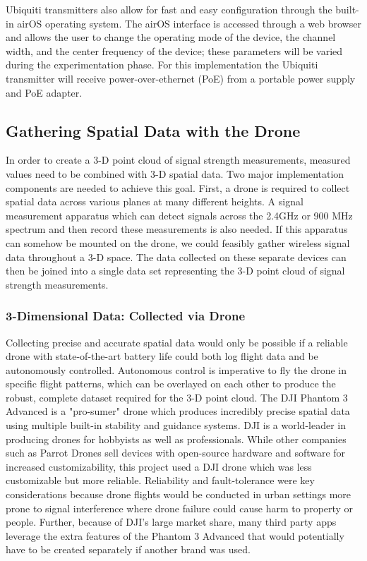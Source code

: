 \documentclass[pageno]{jpaper}
\begin{document}
Ubiquiti transmitters also allow for fast and easy configuration through the built-in airOS operating system. The airOS interface is accessed through a web browser and allows the user to change the operating mode of the device, the channel width, and the center frequency of the device; these parameters will be varied during the experimentation phase. For this implementation the Ubiquiti transmitter will receive power-over-ethernet (PoE) from a portable power supply and PoE adapter.

\subsection{Gathering Spatial Data with the Drone}
In order to create a 3-D point cloud of signal strength measurements, measured values need to be combined with 3-D spatial data. Two major implementation components are needed to achieve this goal. First, a drone is required to collect spatial data across various planes at many different heights. A signal measurement apparatus which can detect signals  across the 2.4GHz or 900 MHz spectrum and then record these measurements is also needed. If this apparatus can somehow be mounted on the drone, we could feasibly gather wireless signal data throughout a 3-D space. The data collected on these separate devices  can then be joined into a single data set representing the 3-D point cloud of signal strength measurements. 

\subsubsection{3-Dimensional Data: Collected via Drone}
Collecting precise and accurate spatial data would only be possible if a reliable  drone with state-of-the-art battery life could both log flight data and be autonomously controlled. Autonomous control is imperative to fly the drone in specific flight patterns, which can be overlayed on each other to produce the robust, complete dataset required for the 3-D point cloud. The DJI Phantom 3 Advanced\cite{p3a} is a "pro-sumer" drone which produces incredibly precise spatial data using multiple built-in stability and guidance systems. DJI is a world-leader\cite{dji} in producing drones for hobbyists as well as professionals. While other companies such as Parrot Drones\cite{parrot} sell devices with open-source hardware and software for increased customizability, this project used a DJI drone which was less customizable but more reliable. Reliability and fault-tolerance were key considerations because drone flights would be conducted in urban settings more prone to signal interference where drone failure could cause harm to property or people. Further, because of DJI's large market share, many third party apps leverage the extra features of the Phantom 3 Advanced that would potentially have to be created separately if another brand was used. 
\end{document}
